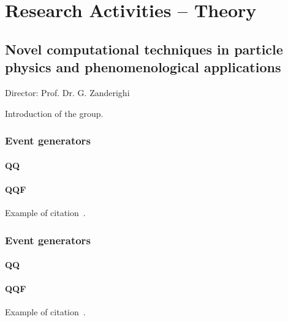 \documentclass{FBR_Bericht_2025}
\begin{document}
\onecolumn
{}
\tableofcontents
\cleardoublepage

\twocolumn

\chapter{Research Activities -- Theory}
\section{Novel computational techniques in particle physics and phenomenological applications}
\begin{Namen}
Director: Prof. Dr. G. Zanderighi
\end{Namen}
Introduction of the group.

\subsection[Event generators]{Event generators}
\begin{refsection}
\subsubsection{QQ}
\subsubsection{QQF}
Example of citation~\cite{Biello:2024pgo}.
\end{refsection}

\subsection[Event generators]{Event generators}
\begin{refsection}
\subsubsection{QQ}
\subsubsection{QQF}
Example of citation~\cite{Biello:2024pgo}.
\end{refsection}

\cite{FerrarioRavasio:2024kem}

\clearpage
\onecolumn
\end{document}
